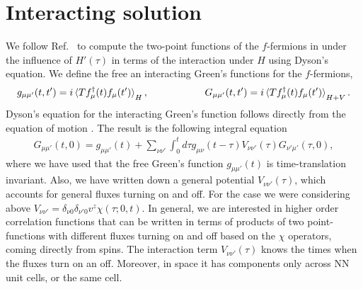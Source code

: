 \documentclass[aps,pra,preprint,groupedaddress]{revtex4-1}
\newcommand{\1}{\mathds{1}}
\begin{document}

\section{Interacting solution}

We follow Ref.~ to compute the two-point functions of the $f$-fermions in under the influence of $H'(\tau)$ in terms of the interaction under $H$ using Dyson's equation. We define the free an interacting Green's functions for the $f$-fermions,
\begin{align}
g_{\mu \mu'}(t,t') = i \braket{T f_\mu^\dagger(t) f_\mu(t')}_H,  \hspace{2cm}
G_{\mu \mu'}(t,t') = i \braket{T f_\mu^\dagger(t) f_\mu(t')}_{H+V}.
\end{align}
Dyson's equation for the interacting Green's function follows directly from the equation of motion \cite{Langreth}. The result is the following integral equation
\begin{align}\label{Dyson}
G_{\mu \mu'}(t,0) = g_{\mu \mu'}(t) + \sum_{\nu \nu'} \int_0^t d \tau g_{\mu \nu}(t-\tau) V_{\nu \nu'}(\tau) G_{\nu' \mu'}(\tau,0), 
\end{align}
where we have used that the free Green's function $ g_{\mu \mu'}(t) $ is time-translation invariant. Also, we have written down a general potential $ V_{\nu \nu'}(\tau)$, which accounts for general fluxes turning on and off. For the case we were considering above $V_{\nu \nu'} = \delta_{\nu 0} \delta_{\nu' 0} v^z \chi(\tau;0,t)$. In general, we are interested in higher order correlation functions that can be written in terms of products of two point-functions with different fluxes turning on and off based on the $\chi$ operators, coming directly from spins. The interaction term $V_{\nu \nu'}(\tau)$ knows the times when the fluxes turn on an off. Moreover, in space it has components only across NN unit cells, or the same cell.
\end{document}
